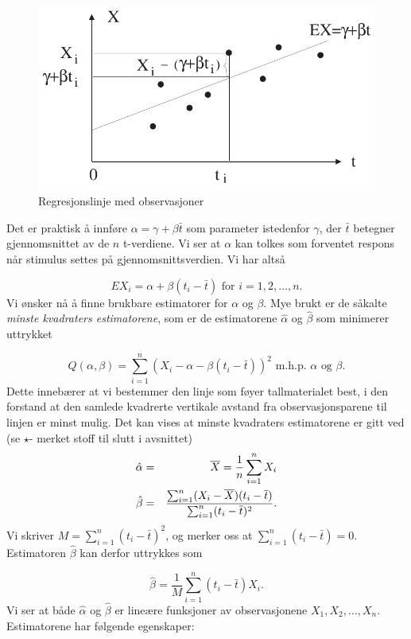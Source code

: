 \begin{figure}[ht]
\centering
	 \includegraphics[scale=0.8]{figurer/fig8_4.pdf} 
 \caption{Regresjonslinje med observasjoner}
	\label{fig:reglinje_observ}
\end{figure}

Det er praktisk å innføre $\alpha=\gamma + \beta \bar t$
som parameter istedenfor $\gamma$, der $\bar t$ betegner
gjennomsnittet av de $n$ t-verdiene.
Vi ser at $\alpha$ kan tolkes som forventet respons
når stimulus settes på gjennomsnittsverdien.
Vi har altså
     
\[ EX_i=\alpha + \beta (t_i-\bar t) \mbox{\ \ for\ } i=1,2,\ldots ,n.\]
Vi ønsker nå å finne brukbare estimatorer for $\alpha$
og $\beta$. Mye brukt er de såkalte {\em minste kvadraters
estimatorene}, som er de estimatorene $\hat \alpha$ og $\hat
\beta$ som minimerer uttrykket

\[ Q(\alpha ,\beta )=\sum_{i=1}^n(X_i-\alpha -\beta (t_i-\bar t))^2
              \mbox{\ \  m.h.p. $\alpha$ og $\beta$.} \]
Dette innebærer at vi bestemmer den linje som føyer
tallmaterialet best, i den forstand at den samlede kvadrerte
vertikale avstand fra observasjonsparene til linjen er minst
mulig. Det kan vises at minste kvadraters estimatorene er gitt ved (se $\star$-
merket stoff til slutt i avsnittet)
\begin{eqnarray*}
  \hat{\alpha}&=&\bar X={1\over n }\sum_{i=1}^n X_i \\
  \hat{\beta} &=&\frac{\sum_{i=1}^n (X_i - \bar{X})(t_i - \bar {t})}
              {\sum_{i=1}^n (t_i - \bar t)^2}.
\end{eqnarray*}
Vi skriver $M=\sum_{i=1}^n (t_i - \bar t)^2$, og merker oss at 
$\sum_{i=1}^n (t_i-\bar t)=0$. Estimatoren $\hat{\beta}$ kan derfor uttrykkes
som

\[   \hat{\beta} =\frac{1}{M}\sum_{i=1}^n (t_i - \bar{t})X_i.\]
Vi ser at både $\hat{\alpha}$ og $\hat{\beta}$ er lineære funksjoner av
observasjonene $X_1,X_2,\ldots ,X_n$. Estimatorene har følgende egenskaper:

